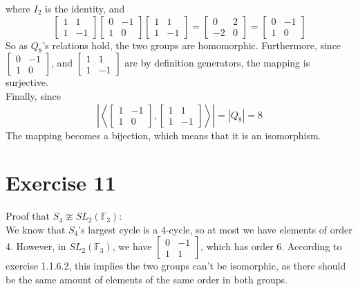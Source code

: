 \documentclass{article}
\newcommand{\F}{\mathbb{F}}
\begin{document}
    where $I_2$ is the identity, and
    \[ \begin{bmatrix} 1 & 1 \\ 1 & -1 \end{bmatrix}
    \begin{bmatrix} 0 & -1 \\ 1 & 0 \end{bmatrix}
    \begin{bmatrix} 1 & 1 \\ 1 & -1 \end{bmatrix}
    = \begin{bmatrix} 0 & 2 \\ -2 & 0 \end{bmatrix}
    = \begin{bmatrix} 0 & -1 \\ 1 & 0 \end{bmatrix} \]
    So as $Q_8$'s relations hold,
    the two groups are homomorphic.
    Furthermore,
    since $\begin{bmatrix} 0 & -1 \\ 1 & 0 \end{bmatrix}$,
    and $\begin{bmatrix} 1 & 1 \\ 1 & -1 \end{bmatrix}$
    are by definition generators,
    the mapping is surjective. \\
    Finally, since
    \[ \left| \left\langle \begin{bmatrix} 1 & -1 \\ 1 & 0 \end{bmatrix},
    \begin{bmatrix} 1 & 1 \\ 1 & -1 \end{bmatrix} \right\rangle \right|
    = |Q_8| = 8 \]
    The mapping becomes a bijection,
    which means that it is an isomorphism.


    \section*{Exercise 11}
    Proof that $S_4 \ncong SL_2(\F_3)$: \\
    We know that $S_4$'s largest cycle is a 4-cycle,
    so at most we have elements of order 4.
    However, in $SL_2(\F_3)$,
    we have $ \begin{bmatrix} 0 & -1 \\ 1 & 1 \end{bmatrix}$,
    which has order 6.
    According to exercise 1.1.6.2,
    this implies the two groups can't be isomorphic,
    as there should be the same amount of elements of the same
    order in both groups.
\end{document}
